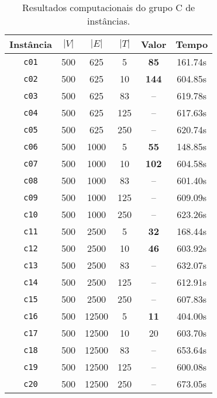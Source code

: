 \documentclass{article}
\begin{document}
\begin{table}
    \centering
    \begin{tabular}{c|c|c|c|c|c}
        Instância & $|V|$ & $|E|$ & $|T|$ & Valor     & Tempo   \\\hline
        {\tt c01} & 500   & 625   & 5     & {\bf 85}  & 161.74s \\
        {\tt c02} & 500   & 625   & 10    & {\bf 144} & 604.85s \\
        {\tt c03} & 500   & 625   & 83    & --        & 619.78s \\
        {\tt c04} & 500   & 625   & 125   & --        & 617.63s \\
        {\tt c05} & 500   & 625   & 250   & --        & 620.74s \\
        {\tt c06} & 500   & 1000  & 5     & {\bf 55}  & 148.85s \\
        {\tt c07} & 500   & 1000  & 10    & {\bf 102} & 604.58s \\
        {\tt c08} & 500   & 1000  & 83    & --        & 601.40s \\
        {\tt c09} & 500   & 1000  & 125   & --        & 609.09s \\
        {\tt c10} & 500   & 1000  & 250   & --        & 623.26s \\
        {\tt c11} & 500   & 2500  & 5     & {\bf 32}  & 168.44s \\
        {\tt c12} & 500   & 2500  & 10    & {\bf 46}  & 603.92s \\
        {\tt c13} & 500   & 2500  & 83    & --        & 632.07s \\
        {\tt c14} & 500   & 2500  & 125   & --        & 612.91s \\
        {\tt c15} & 500   & 2500  & 250   & --        & 607.83s \\
        {\tt c16} & 500   & 12500 & 5     & {\bf 11}  & 404.00s \\
        {\tt c17} & 500   & 12500 & 10    & 20        & 603.70s \\
        {\tt c18} & 500   & 12500 & 83    & --        & 653.64s \\
        {\tt c19} & 500   & 12500 & 125   & --        & 600.08s \\
        {\tt c20} & 500   & 12500 & 250   & --        & 673.05s \\
    \end{tabular}
    \caption{Resultados computacionais do grupo C de instâncias.}
    \label{tab:results-c}
\end{table}
\end{document}
